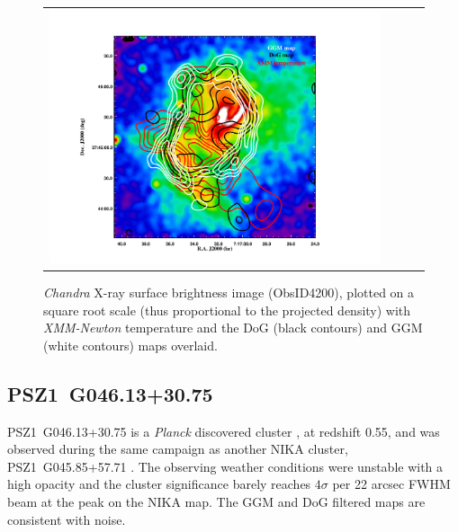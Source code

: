 \documentclass[twocolumn,traditabstract]{aa}
\begin{document}
\begin{figure}[h]
\resizebox{0.5\textwidth}{!} {
\begin{tabular}{llll}
\includegraphics[trim=3cm 1cm 4cm 2cm, clip=true, scale=1]{Figure/MACSJ0717_multiL.pdf} 
\end{tabular}}
\caption{\footnotesize{\textit{Chandra} X-ray surface brightness image (ObsID4200), plotted on a square root scale (thus proportional to the projected density) with \textit{XMM-Newton} temperature \citep[red contours from][]{Adam2017} and the DoG (black contours) and GGM (white contours) maps overlaid.}}
\label{fig:MACSJ0717_multiL}
\end{figure}

\subsection{PSZ1~G046.13+30.75}
\mbox{PSZ1~G046.13+30.75} is a \textit{Planck} discovered cluster \citep{PlanckXXIX2014}, at redshift 0.55, and was observed during the same campaign as another NIKA cluster, \mbox{PSZ1~G045.85+57.71} \citep[see][for more details]{Ruppin2016}. The observing weather conditions were unstable with a high opacity and the cluster significance barely reaches $4 \sigma$ per 22 arcsec FWHM beam at the peak on the NIKA map. The GGM and DoG filtered maps are consistent with noise.

\end{document}
